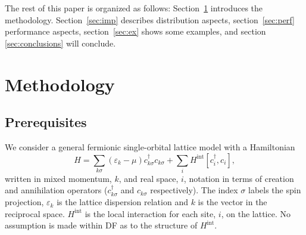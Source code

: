 \documentclass[3p,times,procedia]{elsarticle}
\begin{document}
The rest of this paper is organized as follows: Section~\ref{sec:meth} introduces the methodology. Section~\ref{sec:imp} describes  distribution aspects, section~\ref{sec:perf} performance aspects, section~\ref{sec:ex} shows some examples, and section \ref{sec:conclusions} will conclude.

\section{Methodology}\label{sec:meth}
\subsection{Prerequisites}
We consider a general fermionic single-orbital lattice model with a Hamiltonian
\begin{equation}
H = \sum_{k\sigma} (\varepsilon_k - \mu) c^\dagger_{k\sigma} c_{k\sigma} + \sum_i H^{\mathrm{int}} [c^\dagger_i, c_i],
\end{equation}
written in mixed momentum, $k$, and real space, $i$, notation in terms of creation and annihilation operators ($c^\dagger_{k\sigma}$ and $c_{k\sigma}$ respectively).  The index $\sigma$ labels the spin projection, $\varepsilon_k$ is the lattice dispersion relation and $k$ is the vector in the reciprocal space. 
$H^{\mathrm{int}}$ is the local interaction for each site, $i$, on the lattice. 
No assumption is made within DF as to the structure of $H^{\mathrm{int}}$.  %
\end{document}
